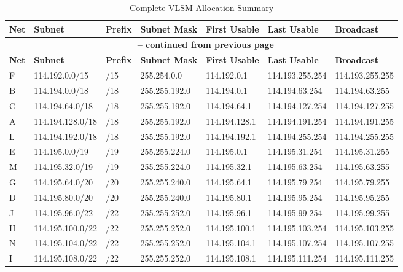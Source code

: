 \documentclass[12pt,a4paper]{report}
\begin{document}
\begin{longtable}{@{}p{1.5cm}p{2cm}p{1.5cm}p{2.5cm}p{2cm}p{2cm}p{2cm}@{}}
\caption{Complete VLSM Allocation Summary}
\label{tab:vlsm-summary}
\\ \toprule
\textbf{Net} & \textbf{Subnet} & \textbf{Prefix} & \textbf{Subnet Mask} & \textbf{First Usable} & \textbf{Last Usable} & \textbf{Broadcast} \\
\midrule
\endfirsthead
\multicolumn{7}{c}{{\bfseries \tablename\ \thetable{} -- continued from previous page}} \\
\toprule
\textbf{Net} & \textbf{Subnet} & \textbf{Prefix} & \textbf{Subnet Mask} & \textbf{First Usable} & \textbf{Last Usable} & \textbf{Broadcast} \\
\midrule
\endhead
\bottomrule
\endfoot
\bottomrule
\endlastfoot
F & 114.192.0.0/15 & /15 & 255.254.0.0 & 114.192.0.1 & 114.193.255.254 & 114.193.255.255 \\
B & 114.194.0.0/18 & /18 & 255.255.192.0 & 114.194.0.1 & 114.194.63.254 & 114.194.63.255 \\
C & 114.194.64.0/18 & /18 & 255.255.192.0 & 114.194.64.1 & 114.194.127.254 & 114.194.127.255 \\
A & 114.194.128.0/18 & /18 & 255.255.192.0 & 114.194.128.1 & 114.194.191.254 & 114.194.191.255 \\
L & 114.194.192.0/18 & /18 & 255.255.192.0 & 114.194.192.1 & 114.194.255.254 & 114.194.255.255 \\
E & 114.195.0.0/19 & /19 & 255.255.224.0 & 114.195.0.1 & 114.195.31.254 & 114.195.31.255 \\
M & 114.195.32.0/19 & /19 & 255.255.224.0 & 114.195.32.1 & 114.195.63.254 & 114.195.63.255 \\
G & 114.195.64.0/20 & /20 & 255.255.240.0 & 114.195.64.1 & 114.195.79.254 & 114.195.79.255 \\
D & 114.195.80.0/20 & /20 & 255.255.240.0 & 114.195.80.1 & 114.195.95.254 & 114.195.95.255 \\
J & 114.195.96.0/22 & /22 & 255.255.252.0 & 114.195.96.1 & 114.195.99.254 & 114.195.99.255 \\
H & 114.195.100.0/22 & /22 & 255.255.252.0 & 114.195.100.1 & 114.195.103.254 & 114.195.103.255 \\
N & 114.195.104.0/22 & /22 & 255.255.252.0 & 114.195.104.1 & 114.195.107.254 & 114.195.107.255 \\
I & 114.195.108.0/22 & /22 & 255.255.252.0 & 114.195.108.1 & 114.195.111.254 & 114.195.111.255 \\
\end{longtable}
\end{document}
